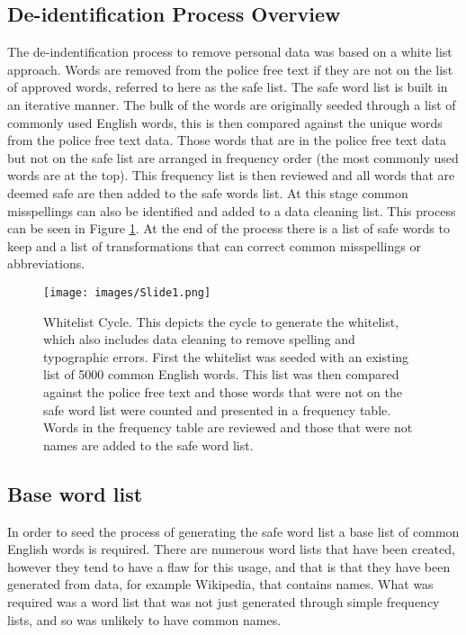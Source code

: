 \subsection{De-identification Process Overview} The de-indentification process to remove personal data was based on a white list approach. Words are removed from the police free text if they are not on the list of approved words, referred to here as the safe list. The safe word list is built in an iterative manner. The bulk of the words are originally seeded through a list of commonly used English words, this is then compared against the unique words from the police free text data. Those words that are in the police free text data but not on the safe list are arranged in frequency order (the most commonly used words are at the top). This frequency list is then reviewed and all words that are deemed safe are then added to the safe words list. At this stage common misspellings can also be identified and added to a data cleaning list. This process can be seen in Figure \ref{fig:whitelist}. At the end of the process there is a list of safe words to keep and a list of transformations that can correct common misspellings or abbreviations.


\begin{figure}[!ht]
  \centering
    \texttt{[image: images/Slide1.png]}
    \caption{{Whitelist Cycle.} This depicts the cycle to generate the whitelist, which also includes data cleaning to remove spelling and typographic errors. First the whitelist was seeded with an existing list of 5000 common English words. This list was then compared against the police free text and those words that were not on the safe word list were counted and presented in a frequency table. Words in the frequency table are reviewed and those that were not names are added to the safe word list.}
    \label{fig:whitelist}
\end{figure}

\subsection{Base word list} In order to seed the process of generating the safe word list a base list of common English words is required. There are numerous word lists that have been created, however they tend to have a flaw for this usage, and that is that they have been generated from data, for example Wikipedia, that contains names. What was required was a word list that was not just generated through simple frequency lists, and so was unlikely to have common names.

